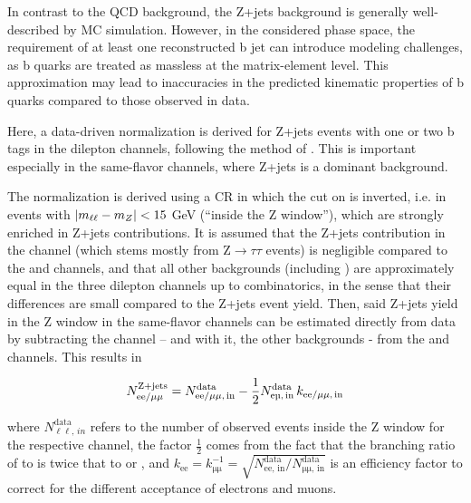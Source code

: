 In contrast to the QCD background, the Z+jets background is generally well-described by MC simulation. 
However, in the considered phase space, the requirement of at least one reconstructed b jet can introduce modeling challenges, as b quarks are treated as massless at the matrix-element level. This approximation may lead to inaccuracies in the predicted kinematic properties of b quarks compared to those observed in data.

Here, a data-driven normalization is derived for Z+jets events with one or two b tags in the dilepton channels, following the method of . This is important especially in the same-flavor channels, where Z+jets is a dominant background.

The normalization is derived using a CR in which the cut on \mll is inverted, i.e. in events with $| m_{\ell\ell} - m_Z | < 15$ GeV (``inside the Z window''), which are strongly enriched in Z+jets contributions. It is assumed that the Z+jets contribution in the \emu channel (which stems mostly from $\mathrm{Z} \rightarrow \tau \tau$ events) is negligible compared to the \ee and \mumu channels, and that all other backgrounds (including \ttbar) are approximately equal in the three dilepton channels up to combinatorics, in the sense that their differences are small compared to the Z+jets event yield. Then, said Z+jets yield in the Z window in the same-flavor channels can be estimated directly from data by subtracting the \emu channel -- and with it, the other backgrounds - from the \ee and \mumu channels. This results in

\begin{equation}
\label{eq:ttxs:zjets_yield}
    N_{\mathrm{ee / \mu\mu}}^{\mathrm{Z+jets}} = N_{\mathrm{ee / \mu\mu,\,in}}^{\mathrm{data}} - \frac{1}{2} N_{\mathrm{\emu,\,in}}^{\mathrm{data}} \, k_{\mathrm{ee / \mu\mu,\,in}}
\end{equation}

\noindent where $N_{\mathrm{\ell \ell},\,in}^{\mathrm{data}}$ refers to the number of observed events inside the Z window for the respective channel, the factor $\frac{1}{2}$ comes from the fact that the branching ratio of \ttbar to \emu is twice that to \ee or \mumu, and $k_{\mathrm{ee}} = k_{\mathrm{\mu\mu}}^{-1} = \sqrt{N_{\mathrm{ee,\,in}}^{\mathrm{data}} / N_{\mathrm{\mu\mu,\,in}}^{\mathrm{data}}}$ is an efficiency factor to correct for the different acceptance of electrons and muons.

